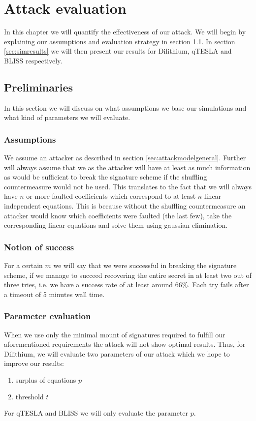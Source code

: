 %




\chapter{Attack evaluation}
In this chapter we will quantify the effectiveness of our attack. We will begin by explaining our assumptions and evaluation strategy in section \ref{sec:attackeval:prelim}. In section \ref{sec:simresults} we will then present our results for Dilithium, qTESLA and BLISS respectively.  

\section{Preliminaries}
\label{sec:attackeval:prelim}
In this section we will discuss on what assumptions we base our simulations and what kind of parameters we will evaluate. 
\subsection{Assumptions}
\label{sec:simassumptions}
We assume an attacker as described in section \ref{sec:attackmodelgeneral}.
Further will always assume that we as the attacker will have at least as much information as would be sufficient to break the signature scheme if the shuffling countermeasure would not be used. This translates to the fact that we will always have $n$ or more faulted coefficients which correspond to at least $n$ linear independent equations. This is because without the shuffling countermeasure an attacker would know which coefficients were faulted (the last few), take the corresponding linear equations and solve them using gaussian elimination.



\subsection{Notion of success}
\label{sec:simsuccess}
For a certain $m$ we will say that we were successful in breaking the signature scheme, if we manage to succeed recovering the entire secret in at least two out of three tries, i.e. we have a success rate of at least around $66\%$. Each try fails after a timeout of 5 minutes wall time.

\subsection{Parameter evaluation}
When we use only the minimal mount of signatures required to fulfill our aforementioned requirements the attack will not show optimal results.
Thus, for Dilithium, we will evaluate two parameters of our attack which we hope to improve our results:
\begin{enumerate}
	\item surplus of equations $p$
	\item threshold $t$
\end{enumerate}
For qTESLA and BLISS we will only evaluate the parameter $p$. 

